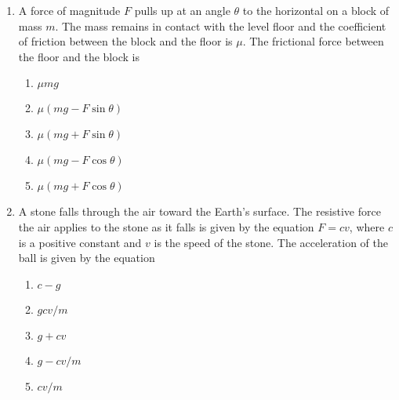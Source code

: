 \documentclass{../../oss-apphys}
\begin{document}
\begin{multicols}{2}
\begin{enumerate}[resume,leftmargin=18pt]
  \item A force of magnitude $F$ pulls up at an angle $\theta$ to the
    horizontal on a block of mass $m$. The mass remains in contact with the
    level floor and the coefficient of friction between the block and the floor
    is $\mu$. The frictional force between the floor and the block is
    \begin{center}
    \end{center}
    \begin{enumerate}[noitemsep,topsep=0pt,leftmargin=18pt,label=(\Alph*)]
    \item$\mu mg$
    \item$\mu (mg-F\sin\theta)$
    \item$\mu (mg+F\sin\theta)$
    \item$\mu (mg-F\cos\theta)$
    \item$\mu (mg+F\cos\theta)$
    \end{enumerate}

    \columnbreak
    
  \item A stone falls through the air toward the Earth's surface. The resistive
    force the air applies to the stone as it falls is given by the equation
    $F=cv$, where $c$ is a positive constant and $v$ is the speed of the stone.
    The acceleration of the ball is given by the equation
    \begin{enumerate}[noitemsep,topsep=0pt,leftmargin=18pt,label=(\Alph*)]
    \item $c-g$
    \item $gcv/m$
    \item $g+cv$
    \item $g-cv/m$
    \item $cv/m$
    \end{enumerate}
    

\end{enumerate}
\end{multicols}
\end{document}
